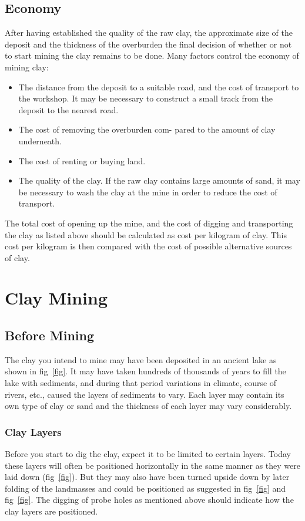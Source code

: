 \subsection{Economy}
After having established the quality of the raw clay, the approximate size of 
the deposit and the thickness of the overburden the final decision of whether 
or not to start mining the clay remains to be done. Many factors control the 
economy of mining clay:
\begin{itemize}
\item The distance from the deposit to a suitable road, and the cost of 
transport to the workshop. It may be necessary to construct a small track from 
the deposit to the nearest road.
\item The cost of removing the overburden com- pared to the amount of clay 
underneath.
\item The cost of renting or buying land.
\item The quality of the clay. If the raw clay contains large amounts of sand, 
it may be necessary to wash the clay at the mine in order to reduce the cost of 
transport.
\end{itemize}
The total cost of opening up the mine, and the cost of digging and transporting 
the clay as listed above should be calculated as cost per kilogram of clay. 
This cost per kilogram is then compared with the cost of possible alternative 
sources of clay.
\section{Clay Mining}
\subsection{Before Mining}
The clay you intend to mine may have been deposited in an ancient lake as shown 
in fig~\ref{fig}. It may have taken hundreds of thousands of years to fill the 
lake 
with sediments, and during that period variations in climate, course of rivers, 
etc., caused the layers of sediments to vary. Each layer may contain its own 
type of clay or sand and the thickness of each layer may vary considerably.
\subsubsection{Clay Layers}
Before you start to dig the clay, expect it to be limited to certain layers. 
Today these layers will often be positioned horizontally in the same manner as 
they were laid down (fig~\ref{fig}). But they may also have been turned upside 
down by later folding of the landmasses and could be positioned as suggested in 
fig~\ref{fig} and fig~\ref{fig}. The digging of probe holes as mentioned above 
should 
indicate how the clay layers are positioned.
